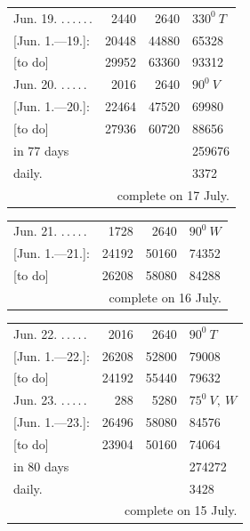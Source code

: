 \begin{center}
\begin{tabular}{@{}p{.36\linewidth}rrl@{}}
Jun. 19. \BJournalDay{♀}\nobreak\hspace{.2em}\mbox{.\,.\,.\,.\,.\,.}\hfill&2440&2640&\(\mathit{330}^0\ T\)\\
\hfill [Jun. 1.—19.]:&20448&44880&65328\\
\hfill [to do]&29952&63360&93312\\
Jun. 20. \BJournalDay{♄}\nobreak\hspace{.2em}\mbox{.\,.\,.\,.\,.}\hfill&2016&2640&\(\mathit{90}^0\ V\)\\
\hfill [Jun. 1.—20.]:&22464&47520&69980\\
\hfill [to do]&27936&60720&88656\\
\hfill in 77 days&&&259676\\
\hfill daily.&&&3372\\
\multicolumn{4}{r}{complete on 17 July.}\\
\hline
\end{tabular}
\end{center}
\begin{center}
\begin{tabular}{@{}p{.36\linewidth}rrl@{}}
Jun. 21. \BJournalDay{☉}\nobreak\hspace{.2em}\mbox{.\,.\,.\,.\,.}\hfill&1728&2640&\(\mathit{90}^0\ W\)\\
\hfill [Jun. 1.—21.]:&24192&50160&74352\\
\hfill [to do]&26208&58080&84288\\
\multicolumn{4}{r}{complete on 16 July.}\\
\hline
\end{tabular}
\end{center}
\begin{center}
\begin{tabular}{@{}p{.36\linewidth}rrl@{}}
Jun. 22. \BJournalDay{☾}\nobreak\hspace{.2em}\mbox{.\,.\,.\,.\,.}\hfill&2016&2640&\(\mathit{90}^0\ T\)\\
\hfill [Jun. 1.—22.]:&26208&52800&79008\\
\hfill [to do]&24192&55440&79632\\
Jun. 23. \BJournalDay{♂}\nobreak\hspace{.2em}\mbox{.\,.\,.\,.\,.}\hfill&288&5280&\(\mathit{75}^0\ V,\ W\)\\
\hfill [Jun. 1.—23.]:&26496&58080&84576\\
\hfill [to do]&23904&50160&74064\\
\hfill in 80 days&&&274272\\
\hfill daily.&&&3428\\
\multicolumn{4}{r}{complete on 15 July.}\\
\hline
\end{tabular}
\end{center}
